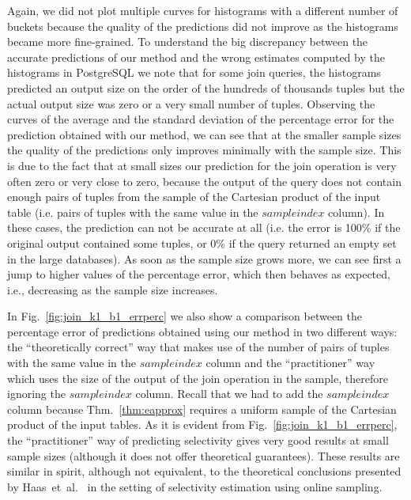 Again,
we did not plot multiple curves for histograms with a different number of
buckets because the quality of the predictions did not improve as the histograms
became more fine-grained. To understand the big discrepancy between the accurate
predictions of our method and the wrong estimates computed by the histograms in
PostgreSQL  we note that  for some join queries, the
histograms predicted an output size on the order of the hundreds of thousands
tuples but the actual output size was zero or a very small number of tuples.
Observing the curves of
the average and the standard deviation of the percentage error for the
prediction obtained with our method, we can see that at the smaller sample sizes
the quality of the predictions only improves minimally with the sample size.
This is due to the fact that at small sizes our prediction for the join
operation is very often zero or very close to zero, because the output of the
query does not contain enough pairs of tuples from the sample of the Cartesian
product of the input table (i.e. pairs of tuples with the same value in the
$sampleindex$ column). In these cases, the prediction can not be accurate at all
(i.e. the error is 100\% if the original output contained some tuples, or 0\% if
the query returned an empty set in the large databases). As soon as the sample
size grows more, we can see first a jump to higher values of the percentage
error, which then behaves as expected, i.e., decreasing as the sample size
increases. 

In Fig.~\ref{fig:join_k1_b1_errperc} we also show a
comparison between the percentage error of predictions obtained using our method
in two different ways: the ``theoretically correct'' way that makes use of the
number of pairs of tuples with the same value in the $sampleindex$ column and
the ``practitioner'' way which uses the size of the output of the join operation
in the sample, therefore ignoring the $sampleindex$ column. Recall that we had
to add the $sampleindex$ column because Thm.~\ref{thm:eapprox} requires a
uniform sample of the Cartesian product of the input tables.
As it is evident from Fig.~\ref{fig:join_k1_b1_errperc}, the ``practitioner''
way of predicting selectivity gives very good results at small sample sizes
(although it does not offer theoretical guarantees). These results are similar
in spirit, although not equivalent, to the theoretical conclusions presented by
Haas~et~al.~\citeyearpar{HaasNSS96} in the setting of selectivity estimation
using online sampling.

